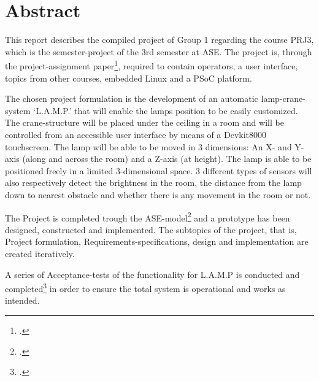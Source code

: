 \chapter*{Abstract}

This report describes the compiled project of Group 1 regarding the course PRJ3, which is the semester-project of the 3rd semester at ASE. The project is, through the project-assignment paper\footcite{prj3-oplaeg}, required to contain operators, a user interface, topics from other courses, embedded Linux and a PSoC platform.

The chosen project formulation is the development of an automatic lamp-crane-system ‘L.A.M.P.’ that will enable the lamps position to be easily customized. The crane-structure will be placed under the ceiling in a room and will be controlled from an accessible user interface by means of a Devkit8000 touchscreen. The lamp will be able to be moved in 3 dimensions: An X- and Y-axis (along and across the room) and a Z-axis (at height). The lamp is able to be positioned freely in a limited 3-dimensional space. 3 different types of sensors will also respectively detect the brightness in the room, the distance from the lamp down to nearest obstacle and whether there is any movement in the room or not.

The Project is completed trough the ASE-model\footcite{udviklingVejledning} and a prototype has been designed, constructed and implemented. The subtopics of the project, that is, Project formulation, Requirements-specifications, design and implementation are created iteratively.

A series of Acceptance-tests of the functionality for L.A.M.P is conducted and completed\footcite{documentation} in order to ensure the total system is operational and works as intended.